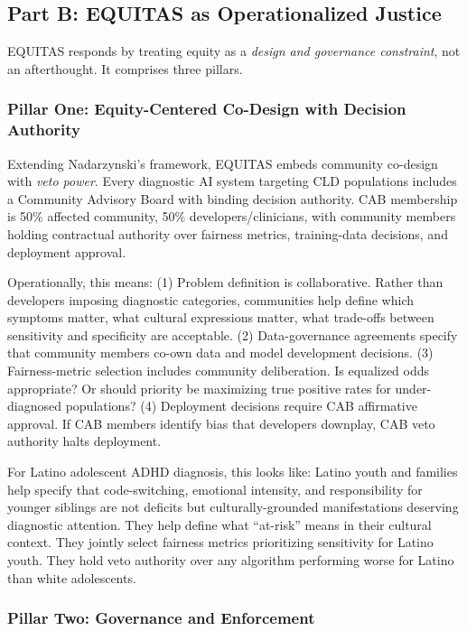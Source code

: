 \documentclass[12pt,a4paper]{article}
\begin{document}
\subsection{Part B: EQUITAS as Operationalized Justice}

EQUITAS responds by treating equity as a \textit{design and governance constraint}, not an afterthought. It comprises three pillars.

\subsubsection{Pillar One: Equity-Centered Co-Design with Decision Authority}

Extending Nadarzynski's framework, EQUITAS embeds community co-design with \textit{veto power}. Every diagnostic AI system targeting CLD populations includes a Community Advisory Board with binding decision authority. CAB membership is 50\% affected community, 50\% developers/clinicians, with community members holding contractual authority over fairness metrics, training-data decisions, and deployment approval.

Operationally, this means: (1) Problem definition is collaborative. Rather than developers imposing diagnostic categories, communities help define which symptoms matter, what cultural expressions matter, what trade-offs between sensitivity and specificity are acceptable. (2) Data-governance agreements specify that community members co-own data and model development decisions. (3) Fairness-metric selection includes community deliberation. Is equalized odds appropriate? Or should priority be maximizing true positive rates for under-diagnosed populations? (4) Deployment decisions require CAB affirmative approval. If CAB members identify bias that developers downplay, CAB veto authority halts deployment.

For Latino adolescent ADHD diagnosis, this looks like: Latino youth and families help specify that code-switching, emotional intensity, and responsibility for younger siblings are not deficits but culturally-grounded manifestations deserving diagnostic attention. They help define what ``at-risk'' means in their cultural context. They jointly select fairness metrics prioritizing sensitivity for Latino youth. They hold veto authority over any algorithm performing worse for Latino than white adolescents.

\subsubsection{Pillar Two: Governance and Enforcement}
\end{document}
